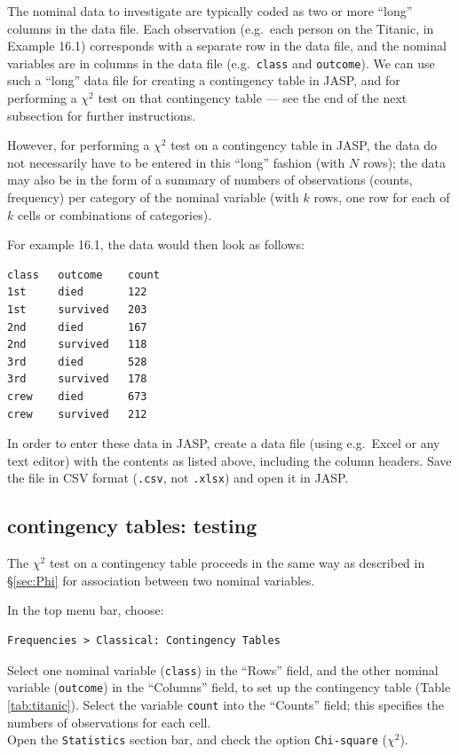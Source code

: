\documentclass[
]{book}
\begin{document}
The nominal data to investigate are typically coded as two or more ``long'' columns in the data file. Each observation (e.g.~each person on the Titanic, in Example 16.1) corresponds with a separate row in the data file, and the nominal variables are in columns in the data file (e.g.~\texttt{class} and \texttt{outcome}). We can use such a ``long'' data file for creating a contingency table in JASP, and for performing a \(\chi^2\) test on that contingency table --- see the end of the next subsection for further instructions.

However, for performing a \(\chi^2\) test on a contingency table in JASP, the data do not necessarily have to be entered in this ``long'' fashion (with \(N\) rows); the data may also be in the form of a summary of numbers of observations (counts, frequency) per category of the nominal variable (with \(k\) rows, one row for each of \(k\) cells or combinations of categories).

For example 16.1, the data would then look as follows:

\begin{verbatim}
class   outcome    count
1st     died       122
1st     survived   203
2nd     died       167
2nd     survived   118
3rd     died       528
3rd     survived   178
crew    died       673
crew    survived   212
\end{verbatim}

In order to enter these data in JASP, create a data file (using e.g.~Excel or any text editor) with the contents as listed above, including the column headers. Save the file in CSV format (\texttt{.csv}, not \texttt{.xlsx}) and open it in JASP.

\hypertarget{contingency-tables-testing-1}{%
\subsection{contingency tables: testing}\label{contingency-tables-testing-1}}

The \(\chi^2\) test on a contingency table proceeds in the same way as described in
§\ref{sec:Phi} for association between two nominal variables.

In the top menu bar, choose:

\begin{verbatim}
Frequencies > Classical: Contingency Tables
\end{verbatim}

Select one nominal variable (\texttt{class}) in the ``Rows'' field, and the other nominal variable (\texttt{outcome}) in the ``Columns'' field, to set up the contingency table (Table \ref{tab:titanic}).
Select the variable \texttt{count} into the ``Counts'' field; this specifies the numbers of observations for each cell.\\
Open the \texttt{Statistics} section bar, and check the option \texttt{Chi-square} (\(\chi^2\)).
\end{document}
